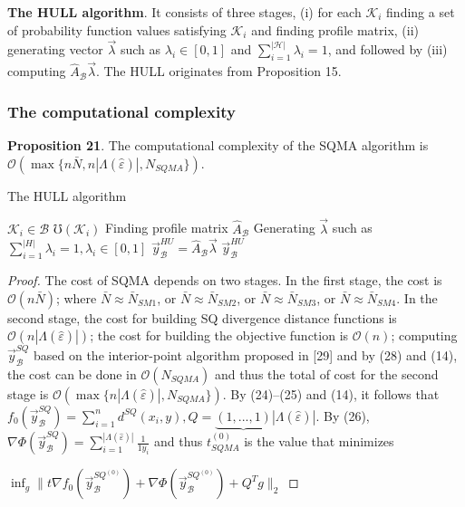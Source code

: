 \documentclass[]{iosart2c}
\begin{document}
  \textbf{The HULL algorithm}. It consists of three stages, (i) for each $\mathcal{K}_i$ finding a set of probability function
  values satisfying $\mathcal{K}_i$ and finding profile matrix, (ii)
  generating vector $\vec{\lambda}$ such as $\lambda_i \in [0, 1]$ and
  $\sum^|\mathcal{H}|_{i=1} \lambda_i = 1$, and followed by (iii) computing $\hat{A}_\mathcal{B}\vec{\lambda}$. The HULL originates from Proposition 15.

  \subsubsection{The computational complexity}

  \textbf{Proposition 21}. The computational complexity of the
  SQMA algorithm is $\mathcal{O}(\max\{n \bar{N}, n|\Lambda(\hat{\varepsilon})|,N_{SQMA} \})$.

  \begin{algorithm}
    \caption{The HULL algorithm}
    \begin{algorithmic}[1]
      \For
        $\mathcal{K}_i \in \mathcal{B}$
        \State $\mho(\mathcal{K}_i)$
      \EndFor
      \State Finding profile matrix $\hat{A}_\mathcal{B}$
      \State Generating $\vec{\lambda}$ such as $\sum^|H|_{i=1} \lambda_i = 1, \lambda_i \in [0, 1]$
      \State $\vec{y}^{HU}_\mathcal{B} = \hat{A}_\mathcal{B} \vec{\lambda}$
      \State \Return $\vec{y}^{HU}_\mathcal{B}$
    \end{algorithmic}
  \end{algorithm}

  \begin{proof}
    The cost of SQMA depends on two stages. In
    the first stage, the cost is $\mathcal{O}(n\bar N)$; where $\bar N \approx \bar N_{SM1}$, or $\bar N \approx \bar N_{SM2}$, or $\bar N \approx \bar N_{SM3}$, or $\bar N \approx \bar N_{SM4}$. In the
    second stage, the cost for building SQ divergence distance
    functions is $\mathcal{O}(n |\Lambda(\hat{\varepsilon})|)$; the cost for building
    the objective function is $\mathcal{O}(n)$; computing $\vec{y}^{SQ}_\mathcal{B}$ based
    on the interior-point algorithm proposed in [29] and
    by (28) and (14), the cost can be done in $\mathcal{O}(N_{SQMA})$
    and thus the total of cost for the second stage is
    $\mathcal{O}(\max\{n |\Lambda(\hat{\varepsilon})|,N_{SQMA}\})$. By (24)–(25) and (14),
    it follows that $f_0 \left( \vec{y}^{SQ}_\mathcal{B} \right) = \sum^n_{i=1} d^{SQ}(x_i, y), Q = \underbrace{(1, ... , 1)}{|\Lambda(\hat{\varepsilon})|}$. By (26), $\nabla \Phi \left( \vec{y}^{SQ}_\mathcal{B} \right) = \sum^{|\Lambda(\hat{\varepsilon})|}_{i=1} \frac{1}{1
    y_i}$
    and
    thus $t^{(0)}_{SQMA}$ is the value that minimizes

    $\inf_g\parallel t\nabla f_0 \left( \vec{y}^{SQ^{(0)}}_\mathcal{B} \right) +\nabla \Phi \left( \vec{y}^{SQ^{(0)}}_\mathcal{B} \right) + Q^T g \parallel_2$
  \end{proof}
\end{document}
